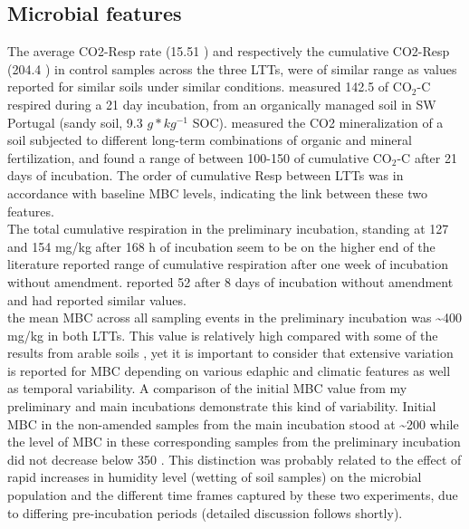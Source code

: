 \documentclass[12pt]{report}
\begin{document}
		\subsection{Microbial features}
		The average CO2-Resp rate (15.51 \respunit) and respectively the cumulative CO2-Resp (204.4 \cumrespunit) in control samples across the three LTTs, were of similar range as values reported for similar soils under similar conditions. \citet{ribeiro2010} measured 142.5 \genericunit of CO$ _2 $-C respired during a 21 day incubation, from an organically managed soil in SW Portugal (sandy soil, 9.3 $ g * kg^{-1} $ SOC). \citet{rudrappa2006} measured the CO2 mineralization of a soil subjected to different long-term combinations of organic and mineral fertilization, and found a range of between 100-150 \genericunit of cumulative CO$ _2 $-C after 21 days of incubation.
		The order of cumulative Resp between LTTs was in accordance with baseline MBC levels, indicating the link between these two features. \\
		The total cumulative respiration in the preliminary incubation, standing at 127 and 154 mg/kg after 168 h of incubation seem to be on the higher end of the literature reported range of cumulative respiration after one week of incubation without amendment. \citet{ribeiro2010} reported 52 \cumrespunit after 8 days of incubation without amendment and \citet{kemmitt2008} had reported similar values. \\
		the mean MBC across all sampling events in the preliminary incubation was \~{}400 mg/kg in both LTTs. This value is relatively high compared with some of the results from arable soils \citep{jat2020, haynes1999,garcia-orenes2010}, yet it is important to consider that extensive variation is reported for MBC depending on various edaphic and climatic features as well as temporal variability. A comparison of the initial MBC value from my preliminary and main incubations demonstrate this kind of variability. Initial MBC in the non-amended samples from the main incubation stood at \~{}200 \genericunit while the level of MBC in these corresponding samples from the preliminary incubation did not decrease below 350 \genericunit. This distinction was probably related to the effect of rapid increases in humidity level (wetting of soil samples) on the microbial population and the different time frames captured by these two experiments, due to differing pre-incubation periods (detailed discussion follows shortly).\\
\end{document}
